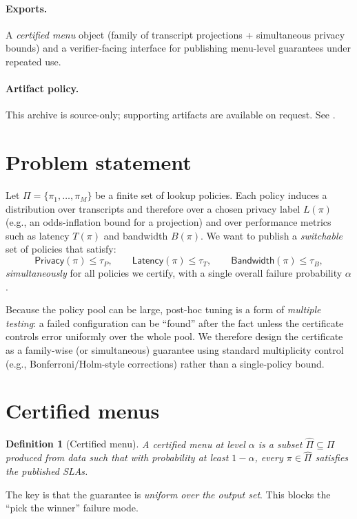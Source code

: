 \documentclass[11pt]{article}
\newtheorem{definition}{Definition}
\begin{document}
\paragraph{Exports.}
A \emph{certified menu} object (family of transcript projections + simultaneous privacy bounds) and a verifier-facing interface for publishing menu-level guarantees under repeated use.

\paragraph{Artifact policy.}
This archive is source-only; supporting artifacts are available on request. See \cite{series:artifactpolicy}.

\section{Problem statement}
Let $\Pi=\{\pi_1,\dots,\pi_M\}$ be a finite set of lookup policies.
Each policy induces a distribution over transcripts and therefore over a chosen privacy label $L(\pi)$ (e.g., an odds-inflation bound for a projection) and over performance metrics such as latency $T(\pi)$ and bandwidth $B(\pi)$.
We want to publish a \emph{switchable} set of policies that satisfy:
\[
\textsf{Privacy}(\pi)\le \tau_P,\qquad \textsf{Latency}(\pi)\le \tau_T,\qquad \textsf{Bandwidth}(\pi)\le \tau_B,
\]
\emph{simultaneously} for all policies we certify, with a single overall failure probability $\alpha$.

Because the policy pool can be large, post-hoc tuning is a form of \emph{multiple testing}: a failed configuration can be ``found'' after the fact unless the certificate controls error uniformly over the whole pool.
We therefore design the certificate as a family-wise (or simultaneous) guarantee using standard multiplicity control (e.g., Bonferroni/Holm-style corrections) rather than a single-policy bound.\cite{holm1979}

\section{Certified menus}
\begin{definition}[Certified menu]
A certified menu at level $\alpha$ is a subset $\widehat\Pi\subseteq\Pi$ produced from data such that with probability at least $1-\alpha$, every $\pi\in\widehat\Pi$ satisfies the published SLAs.
\end{definition}

The key is that the guarantee is \emph{uniform over the output set}.
This blocks the ``pick the winner'' failure mode.
\end{document}
